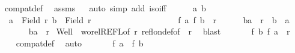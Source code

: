 \begin{isabellebody}
\ {\isachardoublequoteopen}compat{\isacharunderscore}{\kern0pt}def{\isachardoublequoteclose}\ \isamarkupfalse%
\ assms\isanewline
\ \ \isamarkupfalse%
{\isacharparenleft}{\kern0pt}auto\ simp\ add{\isacharcolon}{\kern0pt}\ iso{\isacharunderscore}{\kern0pt}iff{}{\isacharparenright}{\kern0pt}\isanewline
\ \ \ \ \isamarkupfalse%
\ a\ b\ \isamarkupfalse%
\ {\isacharasterisk}{\kern0pt}{\isacharasterisk}{\kern0pt}{\isacharcolon}{\kern0pt}\ {\isachardoublequoteopen}a\ {\isasymin}\ Field\ r{\isachardoublequoteclose}\ {\isachardoublequoteopen}b\ {\isasymin}\ Field\ r{\isachardoublequoteclose}\ \isanewline
\ \ \ \ \ \ \ \ \ \ \ \ \ \ \ \ \ \ {\isacharasterisk}{\kern0pt}{\isacharasterisk}{\kern0pt}{\isacharasterisk}{\kern0pt}{\isacharcolon}{\kern0pt}\ {\isachardoublequoteopen}{\isacharparenleft}{\kern0pt}f\ a{\isacharcomma}{\kern0pt}\ f\ b{\isacharparenright}{\kern0pt}\ {\isasymin}\ r{\isacharprime}{\kern0pt}{\isachardoublequoteclose}\isanewline
\ \ \ \ \isacommand{{\isacharbraceleft}{\kern0pt}}\isamarkupfalse%
\isamarkupfalse%
\ {\isachardoublequoteopen}{\isacharparenleft}{\kern0pt}b{\isacharcomma}{\kern0pt}a{\isacharparenright}{\kern0pt}\ {\isasymin}\ r\ {\isasymor}\ b\ {\isacharequal}{\kern0pt}\ a{\isachardoublequoteclose}\isanewline
\ \ \ \ \ \isamarkupfalse%
\ {\isachardoublequoteopen}{\isacharparenleft}{\kern0pt}b{\isacharcomma}{\kern0pt}a{\isacharparenright}{\kern0pt}\ {\isasymin}\ r{\isachardoublequoteclose}\isamarkupfalse%
\ Well\ {\isacharasterisk}{\kern0pt}{\isacharasterisk}{\kern0pt}\ wo{\isacharunderscore}{\kern0pt}rel{\isachardot}{\kern0pt}REFL{\isacharbrackleft}{\kern0pt}of\ r{\isacharbrackright}{\kern0pt}\ refl{\isacharunderscore}{\kern0pt}on{\isacharunderscore}{\kern0pt}def{\isacharbrackleft}{\kern0pt}of\ {\isacharunderscore}{\kern0pt}\ r{\isacharbrackright}{\kern0pt}\ \isamarkupfalse%
\ blast\isanewline
\ \ \ \ \ \isamarkupfalse%
\ {\isachardoublequoteopen}{\isacharparenleft}{\kern0pt}f\ b{\isacharcomma}{\kern0pt}\ f\ a{\isacharparenright}{\kern0pt}\ {\isasymin}\ r{\isacharprime}{\kern0pt}{\isachardoublequoteclose}\ \isamarkupfalse%
\ {\isacharasterisk}{\kern0pt}\ \isamarkupfalse%
\ compat{\isacharunderscore}{\kern0pt}def\ \isamarkupfalse%
\ auto\isanewline
\ \ \ \ \ \isamarkupfalse%
\ {\isachardoublequoteopen}f\ a\ {\isacharequal}{\kern0pt}\ f\ b{\isachardoublequoteclose}\isanewline
\ \ \ \ \ \isamarkupfalse%

\end{isabellebody}
